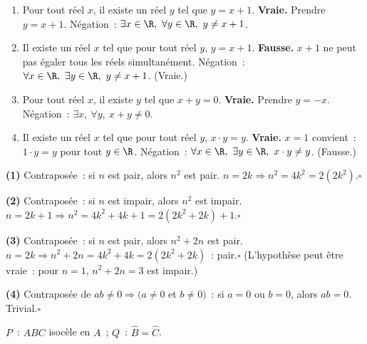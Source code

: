 \begin{enumerate}
  \item \og Pour tout r\'eel $x$, il existe un r\'eel $y$ tel que $y=x+1$.\fg\enspace
        \textbf{Vraie.} Prendre $y=x+1$.
        N\'egation~: $\exists x\in\R,\ \forall y\in\R,\ y\ne x+1$.
  \item \og Il existe un r\'eel $x$ tel que pour tout r\'eel $y$, $y=x+1$.\fg\enspace
        \textbf{Fausse.} $x+1$ ne peut pas \'egaler tous les r\'eels simultanément.
        N\'egation~: $\forall x\in\R,\ \exists y\in\R,\ y\ne x+1$. (Vraie.)
  \item \og Pour tout r\'eel $x$, il existe $y$ tel que $x+y=0$.\fg\enspace
        \textbf{Vraie.} Prendre $y=-x$.
        N\'egation~: $\exists x,\ \forall y,\ x+y\ne0$.
  \item \og Il existe un r\'eel $x$ tel que pour tout r\'eel $y$, $x\cdot y=y$.\fg\enspace
        \textbf{Vraie.} $x=1$ convient~: $1\cdot y=y$ pour tout $y\in\R$.
        N\'egation~: $\forall x\in\R,\ \exists y\in\R,\ x\cdot y\ne y$. (Fausse.)
\end{enumerate}


\textbf{(1)} Contrapos\'ee~: si $n$ est pair, alors $n^2$ est pair.
$n=2k\Rightarrow n^2=4k^2=2(2k^2)$.\hfill$\square$

\textbf{(2)} Contrapos\'ee~: si $n$ est impair, alors $n^2$ est impair.
$n=2k+1\Rightarrow n^2=4k^2+4k+1=2(2k^2+2k)+1$.\hfill$\square$

\textbf{(3)} Contrapos\'ee~: si $n$ est pair, alors $n^2+2n$ est pair.
$n=2k\Rightarrow n^2+2n=4k^2+4k=2(2k^2+2k)$~: pair.\hfill$\square$
(L'hypoth\`ese peut \^etre vraie~: pour $n=1$, $n^2+2n=3$ est impair.)

\textbf{(4)} Contrapos\'ee de $ab\ne0\Rightarrow(a\ne0$ et $b\ne0)$~:
si $a=0$ ou $b=0$, alors $ab=0$. Trivial.\hfill$\square$


$P$~: \og$ABC$ isoc\`ele en $A$\fg~; $Q$~: \og$\hat B=\hat C$\fg.

